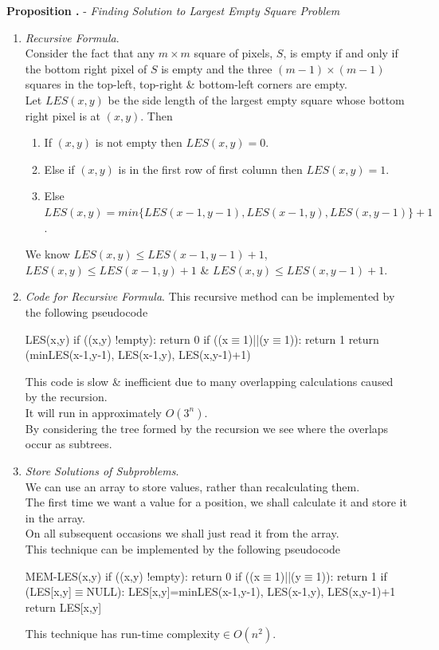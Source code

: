 \documentclass[11pt,a4paper]{article}
\begin{document}
\textbf{Proposition .} - \textit{Finding Solution to Largest Empty Square Problem}
\begin{enumerate}[label=\roman*)]
\item \textit{Recursive Formula}.\\
Consider the fact that any $m\times m$ square of pixels, $S$, is empty if and only if the bottom right pixel of $S$ is empty and the three $(m-1)\times(m-1)$ squares in the top-left, top-right \& bottom-left corners are empty.\\
Let $LES(x,y)$ be the side length of the largest empty square whose bottom right pixel is at $(x,y)$. Then
\begin{enumerate}
  \item If $(x,y)$ is not empty then $LES(x,y)=0$.
  \item Else if $(x,y)$ is in the first row of first column then $LES(x,y)=1$.
  \item Else $LES(x,y)=min\{LES(x-1,y-1), LES(x-1,y), LES(x,y-1)\}+1$.
\end{enumerate}
\nb We know $LES(x,y)\leq LES(x-1,y-1)+1$, $LES(x,y)\leq LES(x-1,y)+1$ \& $LES(x,y)\leq LES(x,y-1)+1$.

\item \textit{Code for Recursive Formula}.
This recursive method can be implemented by the following pseudocode
\begin{code}
LES(x,y)
if ((x,y) !empty):
  return 0
if ((x$\equiv$1)||(y$\equiv$1)):
  return 1
return (min{LES(x-1,y-1), LES(x-1,y), LES(x,y-1)}+1)
\end{code}
This code is slow \& inefficient due to many overlapping calculations caused by the recursion.\\
It will run in approximately $O(3^n)$.\\
By considering the tree formed by the recursion we see where the overlaps occur as subtrees.

\newpage
\item \textit{Store Solutions of Subproblems}.\\
We can use an array to store values, rather than recalculating them.\\
The first time we want a value for a position, we shall calculate it and store it in the array.\\
On all subsequent occasions we shall just read it from the array.\\
This technique can be implemented by the following pseudocode
\begin{code}
MEM-LES(x,y)
if ((x,y) !empty):
  return 0
if ((x$\equiv$1)||(y$\equiv$1)):
  return 1
if (LES[x,y]$\equiv$NULL):
  LES[x,y]=min{LES(x-1,y-1), LES(x-1,y), LES(x,y-1)}+1
return LES[x,y]
\end{code}
\nb This technique has run-time complexity$\in O(n^2)$.


\end{enumerate}
\end{document}
